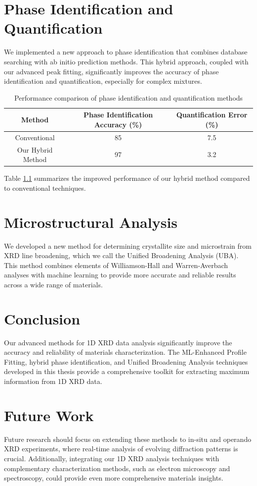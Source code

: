 \documentclass{DMSE-Thesis}
\begin{document}
\chapter{Phase Identification and Quantification}
We implemented a new approach to phase identification that combines database searching with ab initio prediction methods. This hybrid approach, coupled with our advanced peak fitting, significantly improves the accuracy of phase identification and quantification, especially for complex mixtures.

\begin{table}[H]
\centering
\begin{tabular}{|c|c|c|}
\hline
Method & Phase Identification Accuracy (\%) & Quantification Error (\%) \\
\hline
Conventional & 85 & 7.5 \\
Our Hybrid Method & 97 & 3.2 \\
\hline
\end{tabular}
\caption{Performance comparison of phase identification and quantification methods}
\label{tab:phase_analysis}
\end{table}

Table \ref{tab:phase_analysis} summarizes the improved performance of our hybrid method compared to conventional techniques.

\chapter{Microstructural Analysis}
We developed a new method for determining crystallite size and microstrain from XRD line broadening, which we call the Unified Broadening Analysis (UBA). This method combines elements of Williamson-Hall and Warren-Averbach analyses with machine learning to provide more accurate and reliable results across a wide range of materials.

\chapter{Conclusion}
Our advanced methods for 1D XRD data analysis significantly improve the accuracy and reliability of materials characterization. The ML-Enhanced Profile Fitting, hybrid phase identification, and Unified Broadening Analysis techniques developed in this thesis provide a comprehensive toolkit for extracting maximum information from 1D XRD data.

\chapter{Future Work}
Future research should focus on extending these methods to in-situ and operando XRD experiments, where real-time analysis of evolving diffraction patterns is crucial. Additionally, integrating our 1D XRD analysis techniques with complementary characterization methods, such as electron microscopy and spectroscopy, could provide even more comprehensive materials insights.

\backmatter


\end{document}
